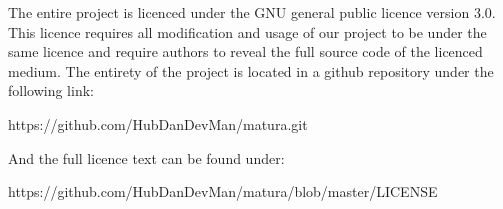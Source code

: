 The entire project is licenced under the GNU general public licence version 3.0. This licence requires all
modification and usage of our project to be under the same licence and require authors to reveal
the full source code of the licenced medium. The entirety of the project is located in a github
repository under the following link:

https://github.com/HubDanDevMan/matura.git

And the full licence text can be found under:

https://github.com/HubDanDevMan/matura/blob/master/LICENSE
